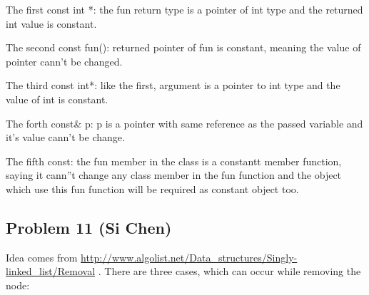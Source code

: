 \documentclass[10pt]{article}
\begin{document}
The first const int *: the fun return type is a pointer
of int type and the returned int value is constant.

The second const fun(): returned pointer of fun is constant, meaning the value
of pointer cann't be changed.

The third const int*: like the first, argument is a pointer to int type and the value of int is constant.

The forth const\& p: p is a pointer with same reference as the passed variable and it's value cann't be change.

The fifth
const: the fun member in the class is a constantt member function, saying it cann''t change any class member in the fun function and the object which use
this fun function will be required as constant object too.

\subsection*{Problem 11 (Si Chen)}
Idea comes from
\url{http://www.algolist.net/Data_structures/Singly-linked_list/Removal}
.
There are three cases, which can occur while removing the node: 
\end{document}

